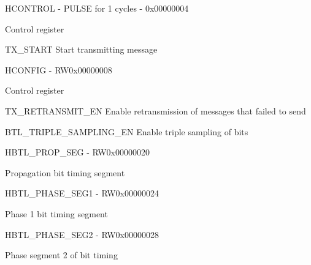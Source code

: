 \documentclass{article}
\begin{document}
\begin{register}{H}{CONTROL - PULSE for 1 cycles - }{0x00000004}  \par Control register \regnewline
  \label{CONTROL}
\regnewline
  \begin{regdesc}\begin{reglist}[TX{\_}START]
    \item [TX{\_}START] Start transmitting message  \end{reglist}\end{regdesc}
\end{register}

\begin{register}{H}{CONFIG - RW}{0x00000008}  \par Control register \regnewline
  \label{CONFIG}
\regnewline
  \begin{regdesc}\begin{reglist}
    \item [TX{\_}RETRANSMIT{\_}EN] Enable retransmission of messages that failed to send    \item [BTL{\_}TRIPLE{\_}SAMPLING{\_}EN] Enable triple sampling of bits  \end{reglist}\end{regdesc}
\end{register}

\begin{register}{H}{BTL{\_}PROP{\_}SEG - RW}{0x00000020}  \par Propagation bit timing segment \regnewline
  \label{BTL_PROP_SEG}
\regnewline
\end{register}

\begin{register}{H}{BTL{\_}PHASE{\_}SEG1 - RW}{0x00000024}  \par Phase 1 bit timing segment \regnewline
  \label{BTL_PHASE_SEG1}
\regnewline
\end{register}

\begin{register}{H}{BTL{\_}PHASE{\_}SEG2 - RW}{0x00000028}  \par Phase segment 2 of bit timing \regnewline
  \label{BTL_PHASE_SEG2}
\regnewline
\end{register}
\end{document}
